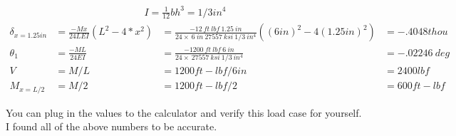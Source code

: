\documentclass[10pt,letterpaper]{article}
\begin{document}
	\begin{align}
		I = \frac{1}{12} b h^3 = 1/3 in^4
	\end{align}
	\begin{align}
		\delta_{x = 1.25 in} &= \frac{ - M x}{24 L E I}(L^2 - 4*x^2) &= \frac{-12\ ft\ lbf\ 1.25 \ in}{24 \times \ 6 \ in \ 27557 \ ksi \ 1/3 \ in^4} ((6 in)^2 - 4 (1.25 in)^2) &= -.4048 thou \\
		\theta_{1} &= \frac{- M L}{24 E I} &= \frac{-1200\ ft\ lbf\ 6 \ in}{24 \times \ 27557 \ ksi \ 1/3 \ in^4} &= -.02246 \ deg \\
		V &= M / L &= 1200 ft-lbf / 6 in &= 2400 lbf \\
		M_{x=L/2} &= M / 2 &= 1200 ft-lbf / 2 &= 600 ft-lbf
	\end{align}

	You can plug in the values to the calculator and verify this load case for yourself. I found all of the above numbers to be accurate.
\end{document}
